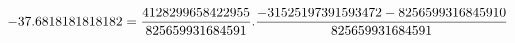 \documentclass[preview]{standalone}
\begin{document}
\begin{align*}
\special{dvisvgm:raw <g id='unique000'>}-37.6818181818182 = \frac{4128299658422955}{825659931684591}. \frac{-31525197391593472 - 8256599316845910}{825659931684591}\special{dvisvgm:raw </g>}
\end{align*}
\end{document}

